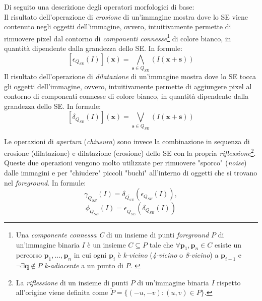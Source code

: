 \par Di seguito una descrizione degli operatori morfologici di base:\\
Il risultato dell'operazione di \textit{erosione} di un'immagine mostra dove lo SE viene contenuto negli oggetti dell'immagine, ovvero, intuitivamente permette di rimuovere pixel dal contorno di \textit{componenti connesse}\footnote{Una \textit{componente connessa} \textit{C} di un insieme di punti \textit{foreground} $P$ di un'immagine binaria $I$ \`e un insieme $C\subseteq P$ tale che $\forall \textbf{p}_{1}, \textbf{p}_{n} \in C$ esiste un percorso $\textbf{p}_{1}, \dots, \textbf{p}_{n}$ in cui ogni $\textbf{p}_{i}$ \`e \textit{k-vicino} (\textit{4-vicino} o \textit{8-vicino}) a $\textbf{p}_{i-1}$ e $\neg \exists \textbf{q}\notin P$ \textit{k-adiacente} a un punto di $P$. \cite{bib:binary-images-connectivity}} di colore bianco, in quantit\`a dipendente dalla grandezza dello SE. In formule:
\begin{equation}
	\label{eq:erosion}
	[\epsilon_{Q_{SE}}(I)](\textbf{x}) = \underset{\textbf{s}\in Q_{SE}}{\bigwedge}(I(\textbf{x}+\textbf{s}))
\end{equation}
Il risultato dell'operazione di \textit{dilatazione} di un'immagine mostra dove lo SE tocca gli oggetti dell'immagine, ovvero, intuitivamente permette di aggiungere pixel al contorno di componenti connesse di colore bianco, in quantit\`a dipendente dalla grandezza dello SE. In formule:
\begin{equation}
	\label{eq:dilation}
	[\delta_{Q_{SE}}(I)](\textbf{x}) = \underset{\textbf{s}\in Q_{SE}}{\bigvee}(I(\textbf{x}+\textbf{s}))
\end{equation}

Le operazioni di \textit{apertura} (\textit{chiusura}) sono invece la combinazione in sequenza di erosione (dilatazione) e dilatazione (erosione) dello SE con la propria \textit{riflessione}\footnote{La \textit{riflessione} di un insieme di punti $P$ di un'immagine binaria $I$ rispetto all'origine viene definita come $\check{P}=\{(-u,-v) \colon (u,v)\in P\}$.}. Queste due operazioni vengono molto utilizzate per rimuovere "sporco" (\textit{noise}) dalle immagini e per "chiudere" piccoli "buchi" all'interno di oggetti che si trovano nel \textit{foreground}. In formule:
\begin{equation}
	\label{eq:opening}
	\gamma_{Q_{SE}}(I) = \delta_{\check{Q_{SE}}}(\epsilon_{Q_{SE}}(I)),
\end{equation}
\begin{equation}
	\label{eq:closing}
	\phi_{Q_{SE}}(I) = \epsilon_{\check{Q_{SE}}}(\delta_{Q_{SE}}(I))
\end{equation}
\par

